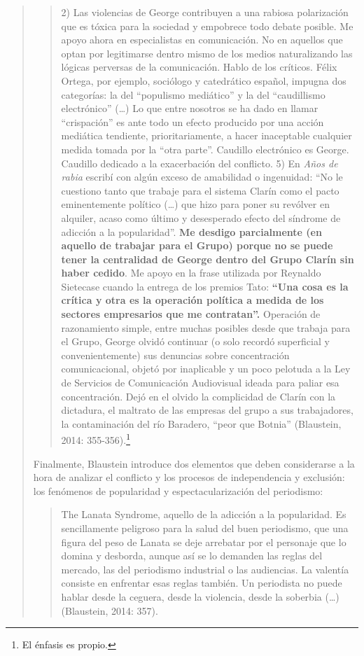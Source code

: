 \begin{quote}
\begin{quote}
	2) Las violencias de George contribuyen a una rabiosa polarización que es tóxica para la sociedad y empobrece todo debate posible. Me apoyo ahora en especialistas en comunicación. No en aquellos que optan por legitimarse dentro mismo de los medios naturalizando las lógicas perversas de la comunicación. Hablo de los críticos. Félix Ortega, por ejemplo, sociólogo y catedrático español, impugna dos categorías: la del \enquote{populismo mediático} y la del \enquote{caudillismo electrónico} (\dots) Lo que entre nosotros se ha dado en llamar \enquote{crispación} es ante todo un efecto producido por una acción mediática tendiente, prioritariamente, a hacer inaceptable cualquier medida tomada por la \enquote{otra parte}. Caudillo electrónico es George. Caudillo dedicado a la exacerbación del conflicto. 5) En \emph{Años de rabia} escribí con algún exceso de amabilidad o ingenuidad: \enquote{No le cuestiono tanto que trabaje para el sistema Clarín como el pacto eminentemente político (\dots) que hizo para poner su revólver en alquiler, acaso como último y desesperado efecto del síndrome de adicción a la popularidad}. \textbf{Me desdigo parcialmente (en aquello de trabajar para el Grupo) porque no se puede tener la centralidad de George dentro del Grupo Clarín sin haber cedido}. Me apoyo en la frase utilizada por Reynaldo Sietecase cuando la entrega de los premios Tato: \textbf{\enquote{Una cosa es la crítica y otra es la operación política a medida de los sectores empresarios que me contratan}.} Operación de razonamiento simple, entre muchas posibles desde que trabaja para el Grupo, George olvidó continuar (o solo recordó superficial y convenientemente) sus denuncias sobre concentración comunicacional, objetó por inaplicable y un poco pelotuda a la Ley de Servicios de Comunicación Audiovisual ideada para paliar esa concentración. Dejó en el olvido la complicidad de Clarín con la dictadura, el maltrato de las empresas del grupo a sus trabajadores, la contaminación del río Baradero, \enquote{peor que Botnia} (Blaustein, 2014: 355-356).\footnote{El énfasis es propio.}
\end{quote}


Finalmente, Blaustein introduce dos elementos que deben considerarse a la hora de analizar el conflicto y los procesos de independencia y exclusión: los fenómenos de popularidad y espectacularización del periodismo:

\begin{quote}
	The Lanata Syndrome, aquello de la adicción a la popularidad. Es sencillamente peligroso para la salud del buen periodismo, que una figura del peso de Lanata se deje arrebatar por el personaje que lo domina y desborda, aunque así se lo demanden las reglas del mercado, las del periodismo industrial o las audiencias. La valentía consiste en enfrentar esas reglas también. Un periodista no puede hablar desde la ceguera, desde la violencia, desde la soberbia (\dots) (Blaustein, 2014: 357).
\end{quote}



\end{quote}
